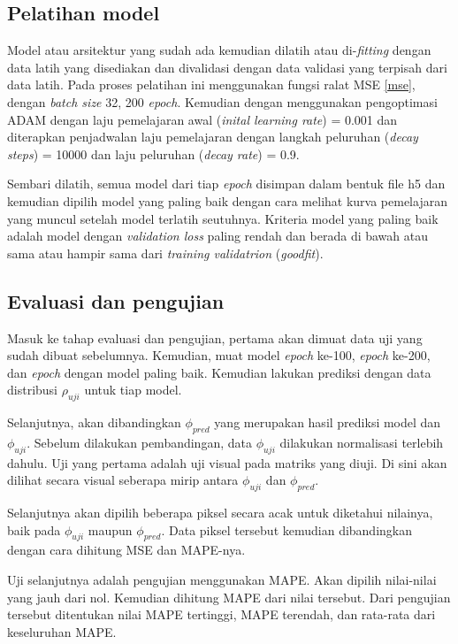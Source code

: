 \subsection{Pelatihan model}
Model atau arsitektur yang sudah ada kemudian dilatih atau di-\emph{fitting} dengan
data latih yang disediakan dan divalidasi dengan data validasi yang terpisah dari
data latih. Pada proses pelatihan ini menggunakan fungsi ralat MSE \ref{mse}, dengan
\emph{batch size} 32, 200 \emph{epoch}. Kemudian dengan menggunakan pengoptimasi
ADAM \citep{kingma2017adam} dengan laju pemelajaran awal (\emph{inital learning
rate}) = 0.001 dan diterapkan penjadwalan laju pemelajaran dengan langkah peluruhan
(\emph{decay steps}) = 10000 dan laju peluruhan (\emph{decay rate}) = 0.9.

Sembari dilatih, semua model dari tiap \emph{epoch} disimpan dalam bentuk file h5
dan kemudian dipilih model yang paling baik dengan cara melihat kurva pemelajaran
yang muncul setelah model terlatih seutuhnya. Kriteria model yang paling baik
adalah model dengan \emph{validation loss} paling rendah dan berada di bawah atau
sama atau hampir sama dari \emph{training validatrion} (\emph{goodfit}).

\subsection{Evaluasi dan pengujian}
Masuk ke tahap evaluasi dan pengujian, pertama akan dimuat data uji yang sudah
dibuat sebelumnya. Kemudian, muat model \emph{epoch} ke-100, \emph{epoch} ke-200,
dan \emph{epoch} dengan model paling baik. Kemudian lakukan prediksi dengan data
distribusi $\rho_{uji}$ untuk tiap model.

Selanjutnya, akan dibandingkan $\phi_{pred}$ yang merupakan hasil prediksi model
dan $\phi_{uji}$. Sebelum dilakukan pembandingan, data $\phi_{uji}$ dilakukan normalisasi
terlebih dahulu. Uji yang pertama adalah uji visual pada matriks yang diuji. Di sini
akan dilihat secara visual seberapa mirip antara $\phi_{uji}$ dan $\phi_{pred}$.

Selanjutnya akan dipilih beberapa piksel secara acak untuk diketahui nilainya,
baik pada $\phi_{uji}$ maupun $\phi_{pred}$. Data piksel tersebut kemudian dibandingkan
dengan cara dihitung MSE dan MAPE-nya.

Uji selanjutnya adalah pengujian menggunakan MAPE. Akan dipilih nilai-nilai yang
jauh dari nol. Kemudian dihitung MAPE dari nilai tersebut. Dari pengujian
tersebut ditentukan nilai MAPE tertinggi, MAPE terendah, dan rata-rata dari
keseluruhan MAPE.

